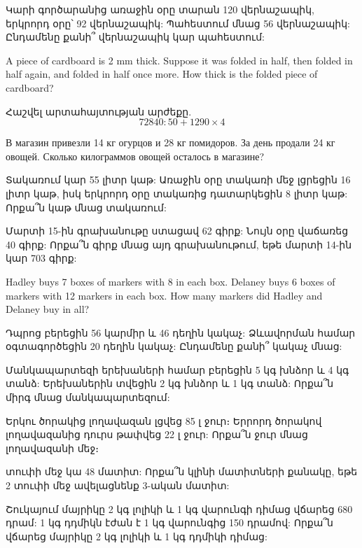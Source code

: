 







\problem 
Կարի գործարանից առաջին օրը տարան 120 վերնաշապիկ, 
երկրորդ օրը՝ 92 վերնաշապիկ: Պահեստում մնաց 56 
վերնաշապիկ: Ընդամենը քանի՞ վերնաշապիկ կար պահեստում:

\problem
A piece of cardboard is 2 mm thick. Suppose it was 
folded in half, then folded in half again, and folded 
in half once more. How thick is the folded piece of 
cardboard?

\problem
Հաշվել արտահայտության արժեքը. $$72840 : 50 + 1290\times 4$$

\problem
В магазин привезли 14 кг огурцов и 28 кг помидоров. За день 
продали 24 кг овощей. Сколько килограммов овощей  осталось 
в магазине?

\problem 
Տակառում կար 55 լիտր կաթ: Առաջին օրը տակառի մեջ 
լցրեցին 16 լիտր կաթ, իսկ երկրորդ օրը տակառից 
դատարկեցին 8 լիտր կաթ: Որքա՞ն կաթ մնաց տակառում:

\problem
Մարտի 15-ին գրախանութը ստացավ 62 գիրք: Նույն օրը 
վաճառեց 40 գիրք: Որքա՞ն գիրք մնաց այդ գրախանութում, 
եթե մարտի 14-ին կար 703 գիրք:

\problem Hadley buys 7 boxes of markers with 8 in each box.
Delaney buys 6 boxes of markers with 12 markers in each box.
How many markers did Hadley and Delaney buy in all?

\problem 
Դպրոց բերեցին 56 կարմիր և 46 դեղին կակաչ: Ձևավորման 
համար օգտագործեցին 20 դեղին կակաչ: Ընդամենը քանի՞ 
կակաչ մնաց:

\problem
Մանկապարտեզի երեխաների համար բերե\-ցին 5 կգ խնձոր և 4 
կգ տանձ: Երեխաներին տվեցին 2 կգ խնձոր և 1 կգ տանձ: 
Որքա՞ն միրգ մնաց մանկապարտեզում:

\problem 
Երկու ծորակից լողավազան լցվեց 85 լ ջուր։ Երրորդ ծորակով 
լողավազանից դուրս թափ\-վեց 22 լ ջուր: Որքա՞ն ջուր մնաց 
լողավա\-զանի մեջ։

 տուփի մեջ կա 48 մատիտ: Որքա՞ն կլինի մա\-տիտների 
քանակը, եթե 2 տուփի մեջ ավելաց\-նենք 3-ական մատիտ:

\problem 
Շուկայում մայրիկը 2 կգ լոլիկի և 1 կգ վարունգի դիմաց վճարեց 
680 դրամ: 1 կգ դդմիկն էժան է 1 կգ վարունգից 150 դրամով: 
Որքա՞ն վճարեց մայրիկը 2 կգ լոլիկի և 1 կգ դդմիկի դիմաց:

